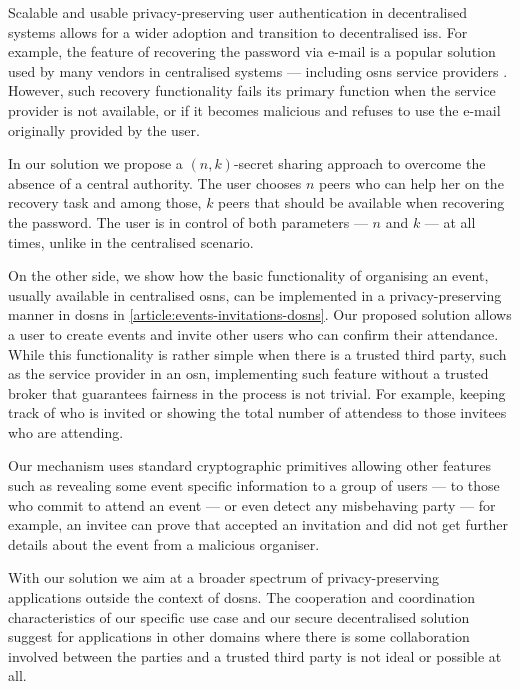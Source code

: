 \documentclass[showtrims,oldfontcommands]{kthesis}
\begin{document}
Scalable and usable privacy-preserving user authentication in decentralised systems 
allows for a wider adoption and transition to decentralised \acp{is}. 
For example, the feature of recovering the password via e-mail is a popular solution 
used by many vendors in centralised systems --- including \acp{osn} service providers 
\cite{Kuzma11}. However, such recovery functionality fails its primary function 
when the service provider is not available, or if it becomes malicious and refuses 
to use the e-mail originally provided by the user. 

In our solution we propose a $(n, k)$-secret sharing approach to overcome the absence 
of a central authority. The user chooses $n$ peers who can help her on the recovery 
task and among those, $k$ peers that should be available when recovering the password. 
The user is in control of both parameters --- $n$ and $k$ ---  at all times, unlike 
in the centralised scenario.

On the other side, we show how the basic functionality of organising an event, usually 
available in centralised \acp{osn}, can be implemented in a privacy-preserving manner 
in \acp{dosn} in \cref{article:events-invitations-dosns}. Our proposed solution 
allows a user to create events and invite other users who can confirm their attendance. 
While this functionality is rather simple when there is a trusted third party, such as 
the service provider in an \ac{osn}, implementing such feature without a trusted 
broker that guarantees fairness in the process is not trivial. For example, keeping 
track of who is invited or showing the total number of attendess to those invitees 
who are attending.

Our mechanism uses standard cryptographic primitives allowing other features such 
as revealing some event specific information to a group of users --- to those who 
commit to attend an event --- or even detect any misbehaving party --- for example, 
an invitee can prove that accepted an invitation and did not get further details 
about the event from a malicious organiser.

With our solution we aim at a broader spectrum of privacy-preserving applications 
outside the context of \acp{dosn}. The cooperation and coordination characteristics 
of our specific use case and our secure decentralised solution suggest for applications 
in other domains where there is some collaboration involved between the parties 
and a trusted third party is not ideal or possible at all.
\end{document}
